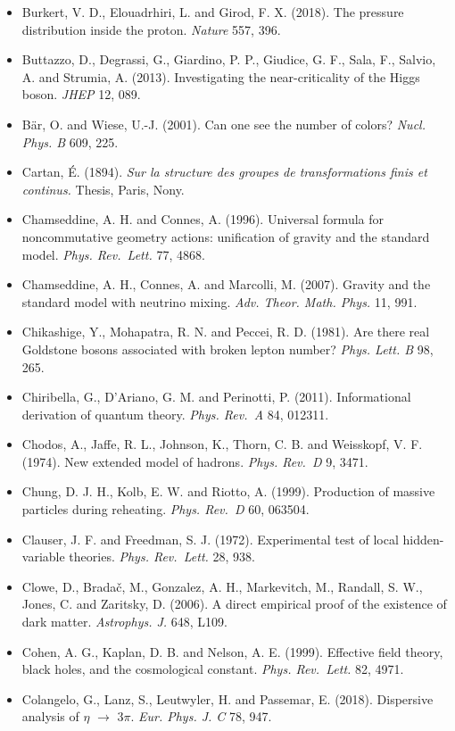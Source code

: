 \documentclass[
  11pt,
]{article}
\begin{document}
\begin{itemize}
\item
  Burkert, V. D., Elouadrhiri, L. and Girod, F. X. (2018). The pressure distribution inside the proton. \emph{Nature} 557, 396.
\item
  Buttazzo, D., Degrassi, G., Giardino, P. P., Giudice, G. F., Sala, F., Salvio, A. and Strumia, A. (2013). Investigating the near-criticality of the Higgs boson. \emph{JHEP} 12, 089.
\item
  Bär, O. and Wiese, U.-J. (2001). Can one see the number of colors? \emph{Nucl. Phys. B} 609, 225.
\item
  Cartan, É. (1894). \emph{Sur la structure des groupes de transformations finis et continus.} Thesis, Paris, Nony.
\item
  Chamseddine, A. H. and Connes, A. (1996). Universal formula for noncommutative geometry actions: unification of gravity and the standard model. \emph{Phys. Rev.~Lett.} 77, 4868.
\item
  Chamseddine, A. H., Connes, A. and Marcolli, M. (2007). Gravity and the standard model with neutrino mixing. \emph{Adv. Theor. Math. Phys.} 11, 991.
\item
  Chikashige, Y., Mohapatra, R. N. and Peccei, R. D. (1981). Are there real Goldstone bosons associated with broken lepton number? \emph{Phys. Lett. B} 98, 265.
\item
  Chiribella, G., D'Ariano, G. M. and Perinotti, P. (2011). Informational derivation of quantum theory. \emph{Phys. Rev.~A} 84, 012311.
\item
  Chodos, A., Jaffe, R. L., Johnson, K., Thorn, C. B. and Weisskopf, V. F. (1974). New extended model of hadrons. \emph{Phys. Rev.~D} 9, 3471.
\item
  Chung, D. J. H., Kolb, E. W. and Riotto, A. (1999). Production of massive particles during reheating. \emph{Phys. Rev.~D} 60, 063504.
\item
  Clauser, J. F. and Freedman, S. J. (1972). Experimental test of local hidden-variable theories. \emph{Phys. Rev.~Lett.} 28, 938.
\item
  Clowe, D., Bradač, M., Gonzalez, A. H., Markevitch, M., Randall, S. W., Jones, C. and Zaritsky, D. (2006). A direct empirical proof of the existence of dark matter. \emph{Astrophys. J.} 648, L109.
\item
  Cohen, A. G., Kaplan, D. B. and Nelson, A. E. (1999). Effective field theory, black holes, and the cosmological constant. \emph{Phys. Rev.~Lett.} 82, 4971.
\item
  Colangelo, G., Lanz, S., Leutwyler, H. and Passemar, E. (2018). Dispersive analysis of \ensuremath{\eta} \ensuremath{\to} 3\ensuremath{\pi}. \emph{Eur. Phys. J. C} 78, 947.

\end{itemize}
\end{document}
